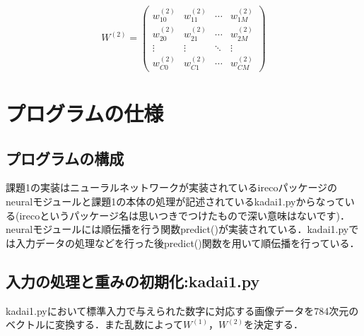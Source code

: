 \documentclass[uplatex]{jsarticle}
\begin{document}
    $$ W^{(2)} = 
    \begin{pmatrix}
        w_{10}^{(2)} & w_{11}^{(2)} & \cdots & w_{1M}^{(2)} \\
        w_{20}^{(2)} & w_{21}^{(2)} & \cdots & w_{2M}^{(2)} \\
        \vdots & \vdots & \ddots & \vdots \\
        w_{C0}^{(2)} & w_{C1}^{(2)} & \cdots & w_{CM}^{(2)} 
    \end{pmatrix}
    $$

    \section{プログラムの仕様}

    \subsection{プログラムの構成}
    課題1の実装はニューラルネットワークが実装されているirecoパッケージのneuralモジュールと課題1の本体の処理が記述されているkadai1.pyからなっている(irecoというパッケージ名は思いつきでつけたもので深い意味はないです)．neuralモジュールには順伝播を行う関数predict()が実装されている．kadai1.pyでは入力データの処理などを行った後predict()関数を用いて順伝播を行っている．
    
    \subsection{入力の処理と重みの初期化:kadai1.py}
    kadai1.pyにおいて標準入力で与えられた数字に対応する画像データを784次元のベクトルに変換する．また乱数によって$W^{(1)}$，$W^{(2)}$を決定する．
\end{document}

